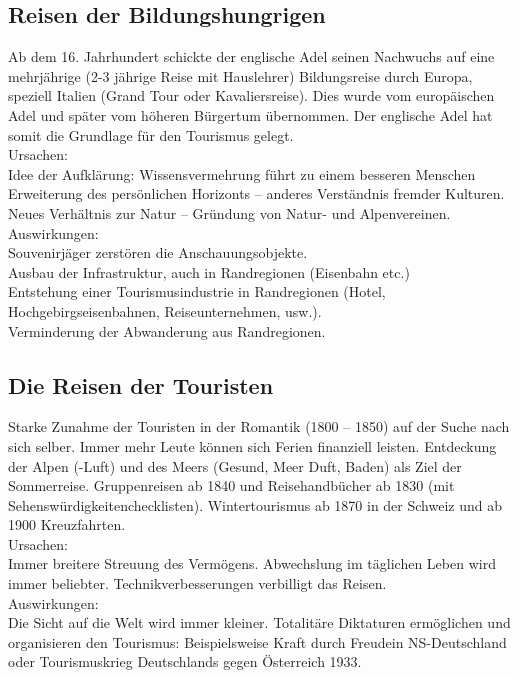 \documentclass[10pt, openright=true]{scrartcl}
\begin{document}
\subsection{Reisen der Bildungshungrigen}
Ab dem 16. Jahrhundert schickte der englische Adel seinen Nachwuchs auf eine mehrjährige (2-3 jährige Reise mit Hauslehrer) Bildungsreise durch Europa, speziell Italien (Grand Tour oder Kavaliersreise). Dies wurde vom europäischen Adel und später vom höheren Bürgertum übernommen. Der englische Adel hat somit die Grundlage für den Tourismus gelegt.\\ Ursachen: \\Idee der Aufklärung: Wissensvermehrung führt zu einem besseren Menschen\\ Erweiterung des persönlichen Horizonts – anderes Verständnis fremder Kulturen.\\ Neues Verhältnis zur Natur – Gründung von Natur- und Alpenvereinen.\\Auswirkungen:\\ Souvenirjäger zerstören die Anschauungsobjekte.\\ Ausbau der Infrastruktur, auch in Randregionen (Eisenbahn etc.)\\ Entstehung einer Tourismusindustrie in Randregionen (Hotel, Hochgebirgseisenbahnen, Reiseunternehmen, usw.).\\ Verminderung der Abwanderung aus Randregionen.
\subsection{Die Reisen der Touristen}
Starke Zunahme der Touristen in der Romantik (1800 – 1850) auf der Suche nach sich selber. Immer mehr Leute können sich Ferien finanziell leisten. Entdeckung der Alpen (-Luft) und des Meers (Gesund, \glqq Meer Duft\grqq, Baden) als Ziel der Sommerreise. Gruppenreisen ab 1840 und Reisehandbücher ab 1830 (mit Sehenswürdigkeitenchecklisten). Wintertourismus ab 1870 in der Schweiz und ab 1900 Kreuzfahrten.\\ Ursachen: \\ Immer breitere Streuung des Vermögens. Abwechslung im täglichen Leben wird immer beliebter. Technikverbesserungen verbilligt das Reisen. \\ Auswirkungen: \\ Die Sicht auf die Welt wird immer kleiner. Totalitäre Diktaturen ermöglichen und organisieren den Tourismus: Beispielsweise \glqq Kraft durch Freude\grqq in NS-Deutschland oder Tourismuskrieg Deutschlands gegen Österreich 1933.
\end{document}
